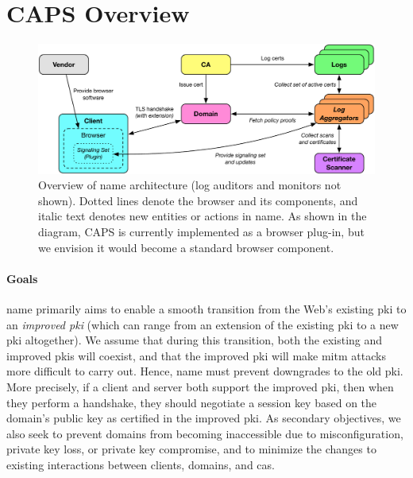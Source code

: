 \section{CAPS Overview}
\label{sec:design:overview}

\begin{figure}
  \centering
  \includegraphics[width=0.8\linewidth]{fig/arch}
  \caption{Overview of \ac{name} architecture (log auditors and monitors not
  shown). Dotted lines denote the browser and its components, and italic text
denotes new entities or actions in \ac{name}.  As shown in the diagram,
CAPS is currently implemented as a browser plug-in, but we envision it
would become a standard browser component.
  }
  \label{fig:overview}
\end{figure}

\paragraph{Goals}

\ac{name} primarily aims to enable a smooth transition from the Web's existing
\ac{pki} to an \emph{improved \ac{pki}} (which can range from an extension of
the existing \ac{pki} to a new \ac{pki} altogether). We assume that during this
transition, both the existing and improved \acp{pki} will coexist, and that the
improved \ac{pki} will make \ac{mitm} attacks more difficult to carry out.
Hence, \ac{name} must prevent downgrades to the old \ac{pki}. More precisely, if
a client and server both support the improved \ac{pki}, then when they perform a
handshake, they should negotiate a session key based on the domain's public key
as certified in the improved \ac{pki}. As secondary objectives, we also seek to
prevent domains from becoming inaccessible due to misconfiguration, private key
loss, or private key compromise, and to minimize the changes to existing
interactions between clients, domains, and \acp{ca}.


